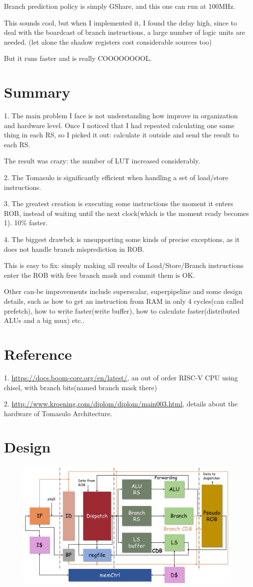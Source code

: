 \documentclass[12pt,letterpaper]{article}
\begin{document}
    Branch prediction policy is simply GShare, and this one can run at 100MHz. 

    This sounds cool, but when I implemented it, I found the delay high, since to deal with the boardcast of branch instructions, 
    a large number of logic units are needed. (let alone the shadow registers cost considerable sources too)

    But it runs faster and is really COOOOOOOOL. 
\section{Summary}
    1. The main problem I face is not understanding how improve in organization and hardware level. 
    Once I noticed that I had repeated calculating one same thing in each RS, so I picked it out: 
    calculate it outside and send the result to each RS. 

    The result was crazy: the number of LUT increased considerably. 

    2. The Tomasulo is significantly efficient when handling a set of load/store instructions. 

    3. The greatest creation is executing some instructions the moment it enters ROB, instead of waiting until 
    the next clock(which is the moment ready becomes 1). 10\% faster. 

    4. The biggest drawbck is unsupporting some kinds of precise exceptions, as it does not handle branch misprediction in ROB. 

    This is easy to fix: simply making all results of Load/Store/Branch instructions enter the ROB with free branch mask 
    and commit them is OK. 

    Other can-be improvements include superscalar, superpipeline and some design details, 
    such as how to get an instruction from RAM in only 4 cycles(can called prefetch), 
    how to write faster(write buffer), how to calculate faster(distributed ALUs and a big mux) etc.. 
\section{Reference}
1. \url{https://docs.boom-core.org/en/latest/}, an out of order RISC-V CPU using chisel, with branch bits(named branch mask there)

2. \url{http://www.kroening.com/diplom/diplom/main003.html}, details about the hardware of Tomasulo Architecture.
\section{Design}
\begin{figure}[H]
    \centering
    \includegraphics[width=165mm]{design.jpg}
\end{figure}
\end{document}
